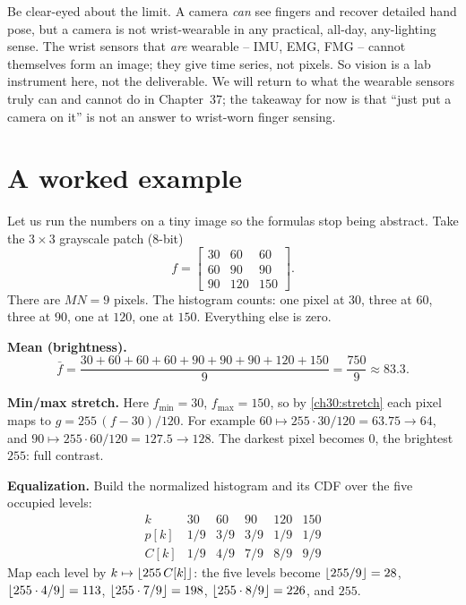 \begin{focusbox}
Be clear-eyed about the limit. A camera \emph{can} see fingers and recover detailed
hand pose, but a camera is not wrist-wearable in any practical, all-day,
any-lighting sense. The wrist sensors that \emph{are} wearable -- IMU, EMG, FMG --
cannot themselves form an image; they give time series, not pixels. So vision is a
lab instrument here, not the deliverable. We will return to what the wearable
sensors truly can and cannot do in Chapter~37; the takeaway for now
is that ``just put a camera on it'' is not an answer to wrist-worn finger sensing.
\end{focusbox}

\section{A worked example}
\label{ch30:worked}

Let us run the numbers on a tiny image so the formulas stop being abstract. Take
the $3\times 3$ grayscale patch (8-bit)
\[
f = \begin{bmatrix} 30 & 60 & 60 \\ 60 & 90 & 90 \\ 90 & 120 & 150 \end{bmatrix}.
\]
There are $MN=9$ pixels. The histogram counts: one pixel at $30$, three at $60$,
three at $90$, one at $120$, one at $150$. Everything else is zero.

\textbf{Mean (brightness).}
\[
\bar f = \frac{30+60+60+60+90+90+90+120+150}{9} = \frac{750}{9} \approx 83.3.
\]

\textbf{Min/max stretch.} Here $f_{\min}=30$, $f_{\max}=150$, so by
\eqref{ch30:stretch} each pixel maps to $g=255\,(f-30)/120$. For example
$60\mapsto 255\cdot 30/120 = 63.75\to 64$, and $90\mapsto 255\cdot 60/120=127.5\to
128$. The darkest pixel becomes $0$, the brightest $255$: full contrast.

\textbf{Equalization.} Build the normalized histogram and its CDF over the five
occupied levels:
\[
\begin{array}{c|ccccc}
k & 30 & 60 & 90 & 120 & 150\\ \hline
p[k] & 1/9 & 3/9 & 3/9 & 1/9 & 1/9\\
C[k] & 1/9 & 4/9 & 7/9 & 8/9 & 9/9
\end{array}
\]
Map each level by $k\mapsto \lfloor255\,C[k]\rfloor$: the five levels become
$\lfloor255/9\rfloor=28$, $\lfloor255\cdot4/9\rfloor=113$, $\lfloor255\cdot7/9\rfloor=198$,
$\lfloor255\cdot8/9\rfloor=226$, and $255$.

